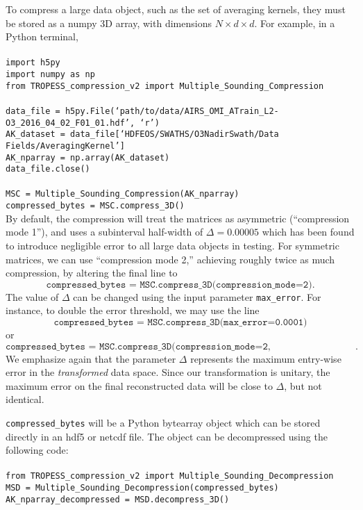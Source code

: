 \documentclass{article}
\begin{document}
To compress a large data object, such as the set of averaging kernels, they must be stored as a numpy 3D array, with dimensions $N \times d \times d$. For example, in a Python terminal, \\ \\
\noindent 
\texttt{import h5py} \\
\texttt{import numpy as np} \\
\texttt{from TROPESS\_compression\_v2 import Multiple\_Sounding\_Compression} \\ \\
\noindent 
\texttt{data\_file = h5py.File(`path/to/data/AIRS\_OMI\_ATrain\_L2-O3\_2016\_04\_02\_F01\_01.hdf', `r')} \\
\texttt{AK\_dataset = data\_file[`HDFEOS/SWATHS/O3NadirSwath/Data Fields/AveragingKernel']} \\
\texttt{AK\_nparray = np.array(AK\_dataset)} \\
\texttt{data\_file.close()} \\ \\
\noindent 
\texttt{MSC = Multiple\_Sounding\_Compression(AK\_nparray)} \\
\texttt{compressed\_bytes = MSC.compress\_3D()} \\

By default, the compression will treat the matrices as asymmetric (``compression mode 1''), and uses a subinterval half-width of $\Delta = 0.00005$ which has been found to introduce negligible error to all large data objects in testing. For symmetric matrices, we can use ``compression mode 2,'' achieving roughly twice as much compression, by altering the final line to $$\texttt{compressed\_bytes = MSC.compress\_3D(compression\_mode=2)}.$$ The value of $\Delta$ can be changed using the input parameter \texttt{max\_error}. For instance, to double the error threshold, we may use the line $$\texttt{compressed\_bytes = MSC.compress\_3D(max\_error=0.0001)}$$ or $$\texttt{compressed\_bytes = MSC.compress\_3D(compression\_mode=2, max\_error=0.0001)}.$$ We emphasize again that the parameter $\Delta$ represents the maximum entry-wise error in the \textit{transformed} data space. Since our transformation is unitary, the maximum error on the final reconstructed data will be close to $\Delta$, but not identical. 

\texttt{compressed\_bytes} will be a Python bytearray object which can be stored directly in an hdf5 or netcdf file. The object can be decompressed using the following code: \\ \\ 
\noindent 
\texttt{from TROPESS\_compression\_v2 import Multiple\_Sounding\_Decompression} \\
\texttt{MSD = Multiple\_Sounding\_Decompression(compressed\_bytes)} \\ 
\texttt{AK\_nparray\_decompressed = MSD.decompress\_3D()} \\ 
\end{document}
